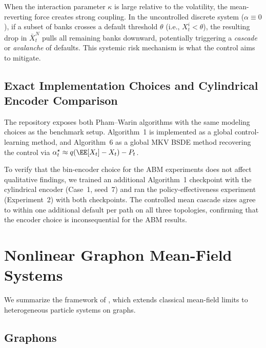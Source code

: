 \documentclass[11pt]{article}
\begin{document}
\begin{remark}
  When the interaction parameter $\kappa$ is large relative to the volatility, the mean-reverting force creates strong coupling. In the uncontrolled discrete system ($\alpha \equiv 0$), if a subset of banks crosses a default threshold $\theta$ (i.e., $X_t^i < \theta$), the resulting drop in $\bar{X}_t^N$ pulls all remaining banks downward, potentially triggering a \emph{cascade} or \emph{avalanche} of defaults. This systemic risk mechanism is what the control aims to mitigate.
\end{remark}

\subsection{Exact Implementation Choices and Cylindrical Encoder Comparison}

The repository exposes both Pham--Warin algorithms with the same modeling choices as the benchmark setup. Algorithm~1 is implemented as a global control-learning method, and Algorithm~6 as a global MKV BSDE method recovering the control via $\alpha_t^\star \approx q(\EE[X_t] - X_t) - P_t$.

To verify that the bin-encoder choice for the ABM experiments does not affect qualitative findings, we trained an additional Algorithm~1 checkpoint with the cylindrical encoder (Case~1, seed~7) and ran the policy-effectiveness experiment (Experiment~2) with both checkpoints. The controlled mean cascade sizes agree to within one additional default per path on all three topologies, confirming that the encoder choice is inconsequential for the ABM results.


\section{Nonlinear Graphon Mean-Field Systems}\label{sec:appendix-graphon}

We summarize the framework of \citet{coppini2025graphon}, which extends classical mean-field limits to heterogeneous particle systems on graphs.

\subsection{Graphons}
\end{document}
